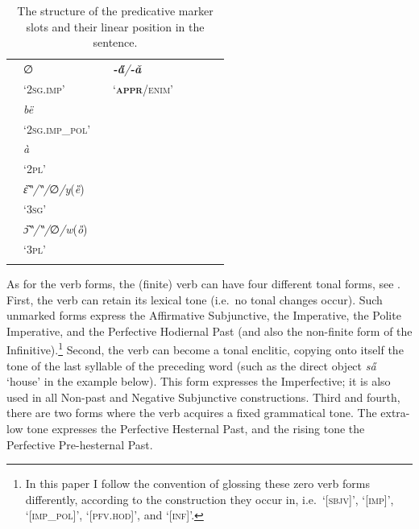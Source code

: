 \documentclass[output=paper,colorlinks,citecolor=brown]{langscibook}
\begin{document}
\begin{table}
\begin{tabular}{l lllll l l}
 \addlinespace
 & {∅} & {} & {\textit{\textbf{-a̋}/\textbf{-ǎ}}} & {} &  &  &  \\
 & {`\textsc{2sg.imp}'} & {} & {`\textsc{\textbf{appr}/enim}'} & {} &  &  &  \\
 \addlinespace
 & {\textit{bë}} & {} & {} & {} &  &  &  \\
 & {`\textsc{2sg.imp\_pol}'} & {} & {} & {} &  &  &  \\
 \addlinespace
 & {\textit{à}} & {} & {} & {} &  &  &  \\
 & {`\textsc{2pl}'} & {} & {} & {} &  &  &  \\
 \addlinespace
 & {\textit{ɛ̏‶/‶/}∅\textit{/y}(\textit{ȅ})} & {} & {} & {} &  &  &  \\
 & {`\textsc{3sg}'} & {} & {} & {} &  &  &  \\
 \addlinespace
 & {\textit{ɔ̏‶/‶/}∅\textit{/w}(\textit{ȍ})} & {} & {} & {} &  &  &  \\
 & {`\textsc{3pl}'} & {} & {} & {} &  &  &  \\ 
\lspbottomrule
\end{tabular}
\caption{The structure of the predicative marker slots and their linear position in the sentence.} 
\label{tab4}
\end{table}

As for the verb forms, the (finite) verb can have four different tonal forms, see . First, the verb can retain its lexical tone (i.e.\ no tonal changes occur). Such unmarked forms express the Affirmative Subjunctive, the Imperative, the Polite Imperative, and the Perfective Hodiernal Past (and also the non-finite form of the Infinitive).\footnote{In \label{zero} this paper I follow the convention of glossing these zero verb forms differently, according to the construction they occur in, i.e.\ `[\textsc{sbjv}]', `[\textsc{imp}]', `[\textsc{imp\_pol}]', `[\textsc{pfv.hod}]', and `[\textsc{inf}]'.} Second, the verb can become a tonal enclitic, copying onto itself the tone of the last syllable of the preceding word (such as the direct object \textit{sa̋} `house' in the example below). This form expresses the Imperfective; it is also used in all Non-past and Negative Subjunctive constructions. Third and fourth, there are two forms where the verb acquires a fixed grammatical tone. The extra-low tone expresses the Perfective Hesternal Past, and the rising tone the Perfective Pre-hesternal Past.
\end{document}
